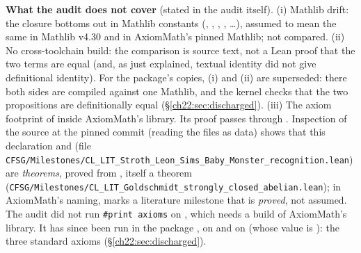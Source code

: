 \begin{dictionary}
\textbf{What the audit does not cover} (stated in the audit itself).  (i) Mathlib drift: the closure bottoms out in Mathlib
constants (, , , ,
\dots), assumed to mean the same in Mathlib v4.30 and in AxiomMath's pinned Mathlib; not compared.  (ii) No cross-toolchain
build: the comparison is source text, not a Lean proof that the two terms are equal (and, as just explained, textual identity
did not give definitional identity).  For the package's copies, (i) and (ii) are superseded: there both sides are compiled
against one Mathlib, and the kernel checks that the two propositions are definitionally equal
(\S\ref{ch22:sec:discharged}).  (iii) The axiom footprint of
 inside AxiomMath's library.  Its proof passes through
.  Inspection of the
source at the pinned commit (reading the files as data) shows that this declaration and
 (file \texttt{CFSG/Milestones/CL\_LIT\_Stroth\_Leon\_Sims\_Baby\_Monster\_recognition.lean})
are \emph{theorems}, proved from , itself a theorem
(\texttt{CFSG/Milestones/CL\_LIT\_Goldschmidt\_strongly\_closed\_abelian.lean}); in AxiomMath's naming,  marks a
literature milestone that is \emph{proved}, not assumed.  The audit did not run \texttt{\#print axioms} on
, which needs a build of AxiomMath's library.  It has since been run in the package
, on  and on  (whose value is ): the
three standard axioms (\S\ref{ch22:sec:discharged}).


\end{dictionary}

